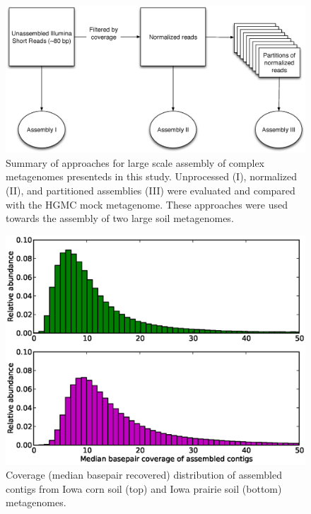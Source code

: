 \documentclass{pnastwo}
\begin{document}
\begin{figure}
\centerline{\includegraphics[width=.7\textwidth]{./figures/new_flowchart.eps}}
\caption{Summary of approaches for large scale assembly of complex metagenomes presenteds in this study.  Unprocessed (I), normalized (II), and partitioned assemblies (III) were evaluated and compared with the HGMC mock metagenome.  These approaches were used towards the assembly of two large soil metagenomes.}
\label{flowchart}
\end{figure}

\begin{figure} \begin{center}
\centerline{\includegraphics[width=.7\textwidth]{./figures/fig3-coverage.eps}}
\caption{Coverage (median basepair recovered) distribution of assembled contigs
from Iowa corn soil (top) and Iowa prairie soil (bottom) metagenomes.}
\label{soilassemblycoverage} \end{center} \end{figure}
\end{document}
